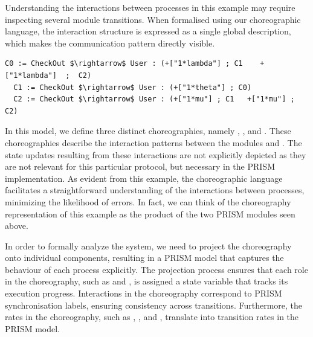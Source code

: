 Understanding the interactions between processes in this example may require inspecting 
several module transitions. 
When formalised using our choreographic language, 
the interaction structure is expressed as a single global description, 
which makes the communication pattern directly visible.
\begin{lstlisting}[style=chor-color,% caption={Example of Listing \ref{example1} in our choreographic language},captionpos=b,
  frame=none, label={example2}]
  C0 := CheckOut $\rightarrow$ User : (+["1*lambda"] ; C1	 +["1*lambda"]  ;  C2)
  C1 := CheckOut $\rightarrow$ User : (+["1*theta"] ; C0)  
  C2 := CheckOut $\rightarrow$ User : (+["1*mu"] ; C1   +["1*mu"] ;  C2)
\end{lstlisting}
In this model, we define three distinct choreographies, namely
, , and . These choreographies
describe the interaction patterns between the modules 
and . The state updates resulting from these
interactions are not explicitly depicted as they are not relevant for
this particular protocol, but necessary in the PRISM implementation.
%
%
As evident from this example, the choreographic language facilitates a
straightforward understanding of the interactions between processes,
minimizing the likelihood of errors. In fact, we can think of the
choreography representation of this example as the product of the two
PRISM modules seen above.


In order to formally analyze the system, we need to project the
choreography onto individual components, resulting in a PRISM model
that captures the behaviour of each process explicitly. The projection
process ensures that each role in the choreography, such as
 and , is assigned a state variable
that tracks its execution progress. Interactions in the choreography
correspond to PRISM synchronisation labels, ensuring consistency
across transitions. Furthermore, the rates in the choreography, such
as , , and ,
translate into transition rates in the PRISM model.

